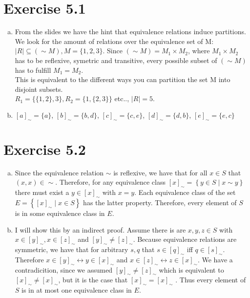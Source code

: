 \documentclass{article} %
\newcommand{\homeworkNumber}{5}
\begin{document}
\section*{Exercise \homeworkNumber.1}

\begin{enumerate}[(a)]
	\item
	From the slides we have the hint that equivalence relations induce partitions.\\
	We look for the amount of relations over the equivalence set of M: $\lvert R \lvert \subseteq (\sim M), M =\{1,2,3\}$.
	Since $(\sim M) = M_1 \times M_2$, where $M_1 \times M_2$ has to be reflexive, symetric and transitive, every possible subset of $(\sim M)$ has to fulfill $M_1 = M_2$. \\
	This is equivalent to the different ways you can partition the set M into disjoint subsets. \\
	$R_1 = \{\{1,2\},3\}, R_2 = \{1,\{2,3\}\}$ etc.., $\lvert R \lvert = 5$.
	\item
	$[a]_\sim = \{a\}$,
	$[b]_\sim = \{b,d\}$,
	$[c]_\sim = \{c,e\}$,
	$[d]_\sim = \{d,b\}$,
	$[e]_\sim = \{e,c\}$


\end{enumerate}



\section*{Exercise \homeworkNumber.2}

\begin{enumerate}[(a)]
	\item Since the equivalence relation \( \sim \) is reflexive, we have that for all \( x \in S \) that \( (x, x) \in \sim \).
	      Therefore, for any equivalence class \( [x]_{\sim} =  \left\{ y \in S \mid x \sim y \right\}  \) there must exist a \( y \in [x]_{\sim}\) with \( x = y \).
	      Each equivalence class of the set \( E = \left\{  [x]_{\sim} \mid x \in S \right\} \) has the latter property.
	      Therefore, every element of \( S \) is in some equivalence class in \( E \).
	\item I will show this by an indirect proof.
	      Assume there is are \( x, y, z \in S\) with \( x \in [y]_{\sim}, x \in [z]_{\sim} \) and \( [y]_{\sim} \neq [z]_{\sim} \).
	      Because equivalence relations are symmetric, we have that for arbitrary \( s,q \) that \( s \in [q]_{\sim} \) iff \( q \in [s]_{\sim} \).
	      Therefore \( x \in [y]_{\sim} \leftrightarrow y \in [x]_{\sim}\) and \( x \in [z]_{\sim} \leftrightarrow z \in [x]_{\sim}\).
	      We have a contradicition, since we assumed \( [y]_{\sim} \neq [z]_{\sim} \) which is equivalent to \( [x]_{\sim} \neq [x]_{\sim} \), but it is the case that \( [x]_{\sim} = [x]_{\sim} \) .
	      Thus every element of \( S \) is in at most one equivalence class in \( E \).
\end{enumerate}
\end{document}
